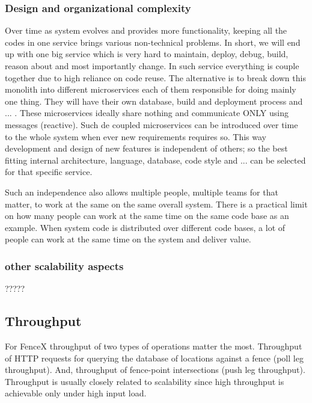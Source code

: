 \documentclass[a4]{report}
\begin{document}
    \subsubsection{Design and organizational complexity}
    Over time as system evolves and provides more functionality, keeping all the codes in one service brings various
    non-technical problems.
    In short, we will end up with one big service which is very hard to maintain, deploy, debug, build, reason about
    and most importantly change.
    In such service everything is couple together due to high reliance on code reuse.
    The alternative is to break down this monolith into different microservices each of them responsible for doing
    mainly one thing.
    They will have their own database, build and deployment process and ... .
    These microservices ideally share nothing and communicate ONLY using messages (reactive).
    Such de coupled microservices can be introduced over time to the whole system when ever new requirements requires so.
    This way development and design of new features is independent of others;
    so the best fitting internal architecture, language, database, code style and ... can be selected for that specific
    service.

    Such an independence also allows multiple people, multiple teams for that matter, to work at the same on the same
    overall system.
    There is a practical limit on how many people can work at the same time on the same code base as an example.
    When system code is distributed over different code bases, a lot of people can work at the same time on the
    system and deliver value.

    \subsubsection{other scalability aspects}
    ?????

    \subsection{Throughput}
    For FenceX throughput of two types of operations matter the most.
    Throughput of HTTP requests for querying the database of locations against a fence (poll leg throughput).
    And, throughput of fence-point intersections (push leg throughput).
    Throughput is usually closely related to scalability since high throughput is achievable only under high input
    load.
\end{document}
